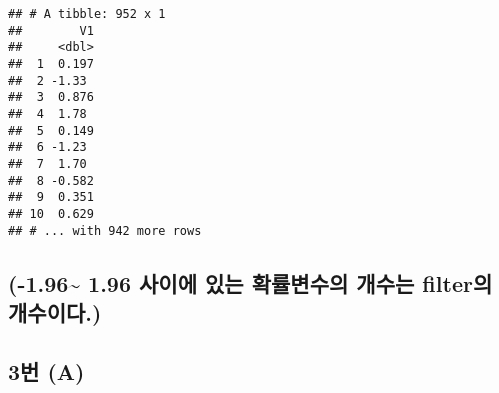 \documentclass[
  12pt,
]{article}
\begin{document}
\begin{verbatim}
## # A tibble: 952 x 1
##        V1
##     <dbl>
##  1  0.197
##  2 -1.33 
##  3  0.876
##  4  1.78 
##  5  0.149
##  6 -1.23 
##  7  1.70 
##  8 -0.582
##  9  0.351
## 10  0.629
## # ... with 942 more rows
\end{verbatim}

\hypertarget{uxc0acuxc774uxc5d0-uxc788uxb294-uxd655uxb960uxbcc0uxc218uxc758-uxac1cuxc218uxb294-filteruxc758-uxac1cuxc218uxc774uxb2e4.}{%
\subsection{(-1.96\textasciitilde{} 1.96 사이에 있는 확률변수의 개수는
filter의
개수이다.)}\label{uxc0acuxc774uxc5d0-uxc788uxb294-uxd655uxb960uxbcc0uxc218uxc758-uxac1cuxc218uxb294-filteruxc758-uxac1cuxc218uxc774uxb2e4.}}

\hypertarget{uxbc88-a}{%
\subsection{3번 (A)}\label{uxbc88-a}}
\end{document}
